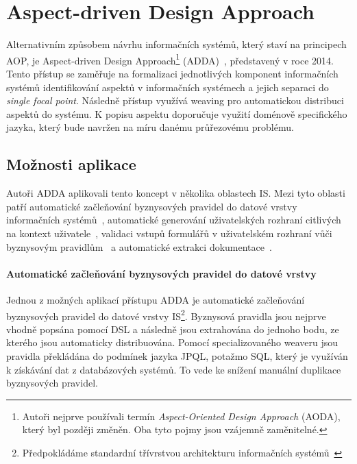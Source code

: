\section{Aspect-driven Design Approach}

Alternativním způsobem návrhu informačních systémů, který staví na principech \gls{AOP},
je Aspect-driven Design Approach\footnote{Autoři nejprve používali termín \textit{Aspect-Oriented
Design Approach} (AODA), který byl později změněn. Oba tyto pojmy jsou vzájemně zaměnitelné.}
(\gls{ADDA})~\cite{cemus2014aspect}, představený v roce 2014.
Tento přístup se zaměřuje na formalizaci jednotlivých komponent informačních systémů identifikování aspektů
v informačních systémech a jejich separaci do \textit{single focal point}.
Následně přístup využívá weaving pro automatickou distribuci aspektů do systému.
K popisu aspektu doporučuje využití doménově specifického jazyka, který bude navržen na
míru danému průřezovému problému.

\subsection{Možnosti aplikace}

Autoři \gls{ADDA} aplikovali tento koncept v několika oblastech \gls{IS}.
Mezi tyto oblasti patří automatické začleňování byznysových pravidel
do datové vrstvy informačních systémů~\cite{cemus2015automated}, automatické
generování uživatelských rozhraní citlivých na kontext uživatele~\cite{cemus2017separation},
validaci vstupů formulářů v uživatelském rozhraní vůči byznysovým pravidlům~\cite{cemus2016context}\cite{cemus2017separation}
a automatické extrakci dokumentace~\cite{cemus2017automated}.

\paragraph{Automatické začleňování byznysových pravidel do datové vrstvy}

Jednou z možných aplikací přístupu \gls{ADDA} je automatické začleňování
byznysových pravidel do datové vrstvy \gls{IS}\footnote{Předpokládáme standardní
třívrstvou architekturu informačních systémů~\cite{fowler2002patterns}}.
Byznysová pravidla jsou nejprve vhodně popsána pomocí \gls{DSL} a následně jsou
extrahována do jednoho bodu, ze kterého jsou automaticky distribuována.
Pomocí specializovaného weaveru jsou pravidla překládána do podmínek
jazyka \gls{JPQL}, potažmo \gls{SQL}, který je využíván k získávání dat
z databázových systémů. To vede ke snížení manuální duplikace byznysových
pravidel.

